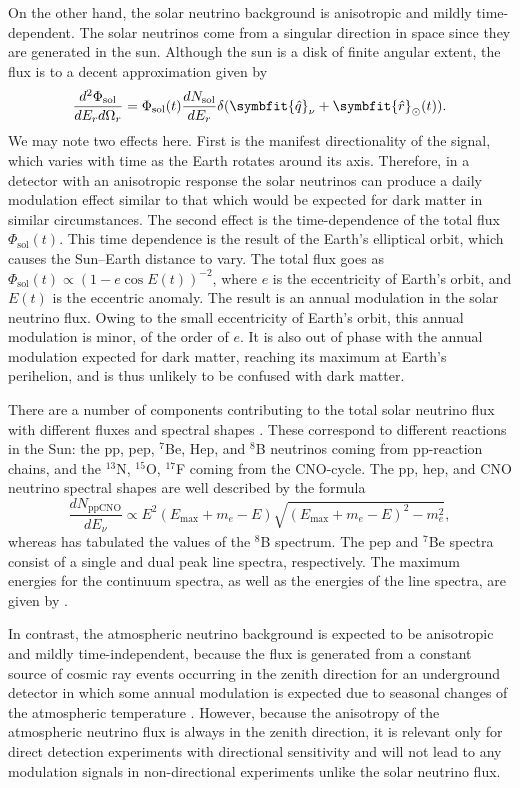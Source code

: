 \documentclass[b5paper, 10pt, twoside]{book}
\newcommand{\der}[2]{\frac{d#1}{d#2}}
\newcommand{\ddder}[3]{\frac{d^2#1}{d#2d#3}}
\newcommand{\unitv}[1]{\symbfit{\hat{#1}}}
\begin{document}
On the other hand, the solar neutrino background is anisotropic and mildly time-dependent. The solar neutrinos come from a singular direction in space since they are generated in the sun. Although the sun is a disk of finite angular extent, the flux is to a decent approximation given by
\begin{equation}
\ddder{\Phi_\text{sol}}{E_r}{\Omega_r}=\Phi_\text{sol}(t)\der{N_\text{sol}}{E_r}\delta(\unitv{q}_\nu+\unitv{r}_\odot(t)).
\end{equation}
We may note two effects here. First is the manifest directionality of the signal, which varies with time as the Earth rotates around its axis. Therefore, in a detector with an anisotropic response the solar neutrinos can produce a daily modulation effect similar to that which would be expected for dark matter in similar circumstances. The second effect is the time-dependence of the total flux $\Phi_\text{sol}(t)$. This time dependence is the result of the Earth's elliptical orbit, which causes the Sun--Earth distance to vary. The total flux goes as $\Phi_\text{sol}(t)\propto(1-e\cos E(t))^{-2}$, where $e$ is the eccentricity of Earth's orbit, and $E(t)$ is the eccentric anomaly. The result is an annual modulation in the solar neutrino flux. Owing to the small eccentricity of Earth's orbit, this annual modulation is minor, of the order of $e$. It is also out of phase with the annual modulation expected for dark matter, reaching its maximum at Earth's perihelion, and is thus unlikely to be confused with dark matter. 

There are a number of components contributing to the total solar neutrino flux with different fluxes and spectral shapes \parencite{VitaglianoTamborraRaffelt2020}. These correspond to different reactions in the Sun: the pp, pep, $^7$Be, Hep, and $^8$B neutrinos coming from pp-reaction chains, and the $^{13}$N, $^{15}$O, $^{17}$F coming from the CNO-cycle. The pp, hep, and CNO neutrino spectral shapes are well described by the formula
\begin{equation}
\der{N_\text{ppCNO}}{E_\nu}\propto E^2(E_\text{max}+m_e-E)\sqrt{(E_\text{max}+m_e-E)^2-m_e^2},
\end{equation}
whereas \textcite{BahcallEtAl1996} has tabulated the values of the $^8$B spectrum. The pep and $^7$Be spectra consist of a single and dual peak line spectra, respectively. The maximum energies for the continuum spectra, as well as the energies of the line spectra, are given by \textcite{Bahcall1997}.

In contrast, the atmospheric neutrino background is expected to be anisotropic and mildly time-independent, because the flux is generated from a constant source of cosmic ray events occurring in the zenith direction for an underground detector \parencite{GaisserHonda2002} in which some annual modulation is expected due to seasonal changes of the atmospheric temperature \parencite{SerapEtAl2010}. However, because the anisotropy of the atmospheric neutrino flux is always in the zenith direction, it is relevant only for direct detection experiments with directional sensitivity and will not lead to any modulation signals in non-directional experiments unlike the solar neutrino flux.
\end{document}
